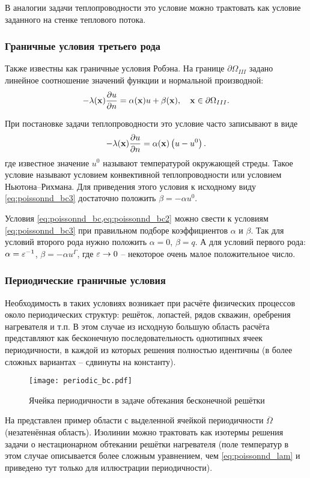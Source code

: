 В аналогии задачи теплопроводности это условие можно трактовать как условие заданного на стенке теплового потока.

\subsubsection{Граничные условия третьего рода}
Также известны как граничные условия Робэна.
На границе $\partial \Omega_{III}$ задано линейное соотношение значений функции и нормальной производной:
\begin{equation}
\label{eq:poissonnd_bc3}
-\lambda(\boldsymbol{\rm x})\frac{\partial u}{\partial n} = \alpha(\boldsymbol{\rm x}) u + \beta(\boldsymbol{\rm x}), \quad \boldsymbol{\rm x} \in \partial\Omega_{III}.
\end{equation}

При постановке задачи теплопроводности это условие часто записывают в виде
$$
-\lambda(\boldsymbol{\rm x})\frac{\partial u}{\partial n} = \alpha(\boldsymbol{\rm x})\left(u - u^0\right).
$$
где известное значение $u^0$ называют температурой окружающей стреды.
Такое условие называют условием конвективной теплопроводности или условием Ньютона--Рихмана.
Для приведения этого условия к исходному виду \cref{eq:poissonnd_bc3} достаточно положить $\beta = -\alpha u^0$.

Условия \cref{eq:poissonnd_bc,eq:poissonnd_bc2}
можно свести к условиям \cref{eq:poissonnd_bc3}
при правильном подборе коэффициентов $\alpha$ и $\beta$.
Так для условий второго рода нужно положить $\alpha=0$, $\beta=q$.
А для условий первого рода: $\alpha=\varepsilon^{-1}$, $\beta = -\alpha u^\Gamma$,
где $\varepsilon\to 0$ -- некоторое очень малое положительное число.

\subsubsection{Периодические граничные условия}
Необходимость в таких условиях
возникает при расчёте физических процессов
около периодических структур: решёток, лопастей, рядов скважин, оребрения нагревателя и т.п.
В этом случае из исходную большую область расчёта
представляют как бесконечную последовательность однотипных ячеек периодичности, 
в каждой из которых решения полностью идентичны (в более сложных вариантах -- сдвинуты на константу).

\begin{figure}[h!]
\centering
\texttt{[image: periodic\_bc.pdf]}
\caption{Ячейка периодичности в задаче обтекания бесконечной решётки}
\label{fig:periodic_bc}
\end{figure}
На  представлен пример области с выделенной ячейкой периодичности $\overline\Omega$ (незатенённая область).
Изолинии можно трактовать как изотермы решения задачи о нестационарном обтекании решётки нагревателя
(поле температур в этом случае описывается более сложным уравнением, чем \cref{eq:poissonnd_lam}
и приведено тут только для иллюстрации периодичности).

